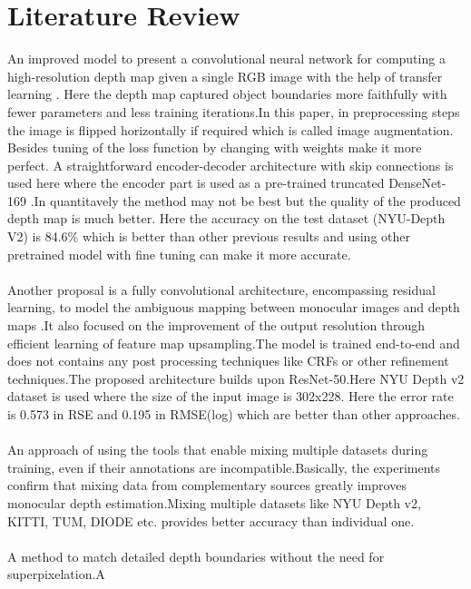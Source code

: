 \documentclass[a4paper,12pt,oneside]{book}
\begin{document}
\section{Literature Review}
An improved model to present a convolutional neural network for computing a high-resolution depth map given a single RGB image with the help of transfer learning \cite{c1}. Here the depth map
captured object boundaries more faithfully with fewer parameters and less training iterations.In this paper, in preprocessing steps the image is flipped horizontally if required which is called image augmentation. Besides tuning of the loss function by changing with weights make it more perfect. A straightforward encoder-decoder architecture with skip connections is used here where the
encoder part is used as a pre-trained truncated DenseNet-169 \cite{articledense} .In quantitavely the method may not be best but the quality of the produced depth map is much better. Here the accuracy on the test dataset (NYU-Depth V2) is 84.6\% which is better than other previous results and using other pretrained model with fine tuning can make it more accurate.
\\\\
Another proposal is a fully convolutional architecture, encompassing residual learning, to model the ambiguous mapping between monocular images and depth maps \cite{c2}.It also focused on the improvement of 
the output resolution through efficient learning of feature map upsampling.The model is trained end-to-end
and does not contains any post processing techniques like CRFs or other refinement techniques.The proposed architecture builds upon ResNet-50.Here NYU Depth v2 dataset is used where the size of
the input image is 302x228. Here the error rate is 0.573 in RSE and 0.195 in RMSE(log) which are better than other approaches.
\\\\
An approach \cite{c3} of using the tools that enable mixing multiple datasets during training, even if their annotations are incompatible.Basically,  the experiments confirm that mixing data from complementary sources greatly improves monocular
depth estimation.Mixing multiple datasets like NYU Depth v2, KITTI, TUM, DIODE etc. provides better accuracy than individual one.
\\\\
A method \cite{c4} to match detailed depth boundaries without the need for superpixelation.A 
\end{document}
